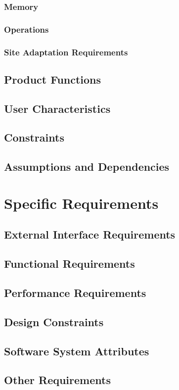 \documentclass[12pt,a4paper]{article}
\begin{document}
		\subsubsection{Memory}
		\subsubsection{Operations}
		\subsubsection{Site Adaptation Requirements}
	\subsection{Product Functions}
	\subsection{User Characteristics}
	\subsection{Constraints}
	\subsection{Assumptions and Dependencies}
	
\section{Specific Requirements}
	\subsection{External Interface Requirements}
	\subsection{Functional Requirements}
	\subsection{Performance Requirements}
	\subsection{Design Constraints}
	\subsection{Software System Attributes}
	\subsection{Other Requirements}
\end{document}
